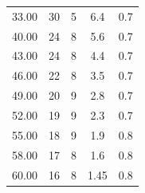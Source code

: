 \begin{figure}[H]
\begin{minipage}{0.2\textwidth}
\begin{tabular}{c c c c c}
        33.00  &  30   &  5    &  6.4   &  0.7 \\
        40.00  &  24   &  8    &  5.6   &  0.7 \\
        43.00  &  24   &  8    &  4.4   &  0.7 \\
        46.00  &  22   &  8    &  3.5   &  0.7 \\
        49.00  &  20   &  9    &  2.8   &  0.7 \\
        52.00  &  19   &  9    &  2.3   &  0.7 \\
        55.00  &  18   &  9    &  1.9   &  0.8 \\
        58.00  &  17   &  8    &  1.6   &  0.8 \\
        60.00  &  16   &  8    &  1.45  &  0.8 \\
        \end{tabular}
        \end{minipage}
    \end{figure}
    \newpage
